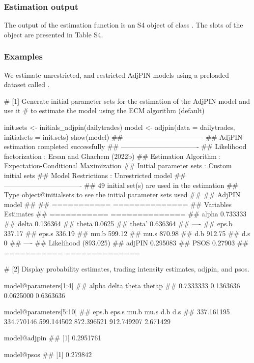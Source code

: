 \subsubsection{Estimation output}
The output of the estimation function  is an S4 object of class . The slots of the  object are presented in Table S4.

\subsubsection{Examples}

We estimate unrestricted, and restricted AdjPIN models using a preloaded dataset called .  

\begin{example}
# [1] Generate initial parameter sets for the estimation of the AdjPIN model and use it
# to estimate the model using the ECM algorithm (default)

init.sets <- initials_adjpin(dailytrades) 
model <- adjpin(data = dailytrades, initialsets = init.sets)
show(model)
## ----------------------------------
## AdjPIN estimation completed successfully
## ----------------------------------
## Likelihood factorization : Ersan and Ghachem (2022b)
## Estimation Algorithm     : Expectation-Conditional Maximization
## Initial parameter sets   : Custom initial sets
## Model Restrictions       : Unrestricted model
## ----------------------------------
## 49 initial set(s) are used in the estimation 
## Type object@initialsets to see the initial parameter sets used
## 
## AdjPIN model  
## 
## ===========  ==============
## Variables    Estimates     
## ===========  ==============
## alpha        0.733333      
## delta        0.136364      
## theta        0.0625        
## theta'       0.636364      
## ----                       
## eps.b        337.17        
## eps.s        336.19        
## mu.b         599.12        
## mu.s         870.98        
## d.b          912.75        
## d.s          0             
## ----                       
## Likelihood   (893.025)     
## adjPIN       0.295083      
## PSOS         0.27903       
## ===========  ==============
\end{example}


\begin{example}
# [2] Display probability estimates, trading intensity estimates, adjpin, and psos.

model@parameters[1:4]
##     alpha     delta     theta    thetap 
## 0.7333333 0.1363636 0.0625000 0.6363636 

model@parameters[5:10]
##      eps.b      eps.s       mu.b       mu.s        d.b        d.s 
## 337.161195 334.770146 599.144502 872.396521 912.749207   2.671429 

model@adjpin
## [1] 0.2951761

model@psos
## [1] 0.279842

\end{example}


